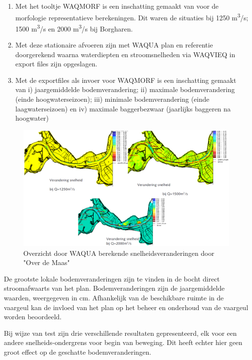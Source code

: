 \begin{enumerate}
\item Met het tooltje WAQMORF is een inschatting gemaakt van voor de morfologie representatieve berekeningen.
Dit waren de situaties bij 1250 m\textsuperscript{3}/s; 1500 m\textsuperscript{3}/s en 2000 m\textsuperscript{3}/s bij Borgharen.

\item Met deze stationaire afvoeren zijn met WAQUA plan en referentie doorgerekend waarna waterdiepten en stroomsnelheden via WAQVIEQ in export files zijn opgeslagen.

\item Met de exportfiles als invoer voor WAQMORF is een inschatting gemaakt van i) jaargemiddelde bodemverandering; ii) maximale bodemverandering (einde hoogwaterseizoen); iii) minimale bodemverandering (einde laagwaterseizoen) en iv) maximale baggerbezwaar (jaarlijks baggeren na hoogwater)
\end{enumerate}

\begin{figure}
\includegraphics[width=\columnwidth]{figures/Fig13.png}
\caption{Overzicht door WAQUA berekende snelheidsveranderingen door "Over de Maas"}
\label{Fig13}
\end{figure}

De grootste lokale bodemveranderingen zijn te vinden in de bocht direct stroomafwaarts van het plan.
Bodemveranderingen zijn de jaargemiddelde waarden, weergegeven in cm.
Afhankelijk van de beschikbare ruimte in de vaargeul kan de invloed van het plan op het beheer en onderhoud van de vaargeul worden beoordeeld.

Bij wijze van test zijn drie verschillende resultaten gepresenteerd, elk voor een andere snelheids-ondergrens voor begin van beweging.
Dit heeft echter hier geen groot effect op de geschatte bodemveranderingen.

